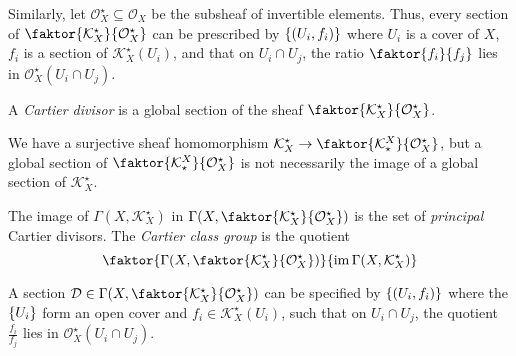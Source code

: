 Similarly, let \( \mathcal O_X^\star \subseteq \mathcal O_X \) be the subsheaf of invertible elements.
Thus, every section of \( \faktor{\mathcal K_X^\star}{\mathcal O_X^\star} \) can be prescribed by \( \qty{(U_i, f_i)} \) where \( U_i \) is a cover of \( X \), \( f_i \) is a section of \( \mathcal K_X^\star(U_i) \), and that on \( U_i \cap U_j \), the ratio \( \faktor{f_i}{f_j} \) lies in \( \mathcal O_X^\star(U_i \cap U_j) \).
\begin{definition}
    A \emph{Cartier divisor} is a global section of the sheaf \( \faktor{\mathcal K_X^\star}{\mathcal O_X^\star} \).
\end{definition}
We have a surjective sheaf homomorphism \( \mathcal K_X^\star \to \faktor{\mathcal K^X_\star}{\mathcal O_X^\star} \), but a global section of \( \faktor{\mathcal K^X_\star}{\mathcal O_X^\star} \) is not necessarily the image of a global section of \( \mathcal K_X^\star \).
\begin{definition}
    The image of \( \Gamma(X, \mathcal K_X^\star) \) in \( \Gamma\qty(X, \faktor{\mathcal K_X^\star}{\mathcal O_X^\star}) \) is the set of \emph{principal} Cartier divisors.
    The \emph{Cartier class group} is the quotient
    \[ \faktor{\Gamma\qty(X, \faktor{\mathcal K_X^\star}{\mathcal O_X^\star})}{\im \Gamma(X, \mathcal K_X^\star)} \]
\end{definition}
A section \( \mathcal D \in \Gamma\qty(X, \faktor{\mathcal K_X^\star}{\mathcal O_X^\star}) \) can be specified by \( \qty{(U_i, f_i)} \) where the \( \qty{U_i} \) form an open cover and \( f_i \in \mathcal K_X^\star(U_i) \), such that on \( U_i \cap U_j \), the quotient \( \frac{f_i}{f_j} \) lies in \( \mathcal O_X^\star(U_i \cap U_j) \).

